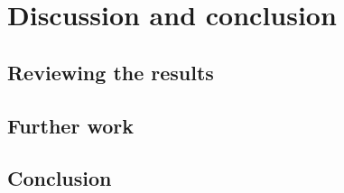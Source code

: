 
\chapter{Discussion and conclusion}

\section{Reviewing the results}




\section{Further work}

\section{Conclusion}



\cleardoublepage